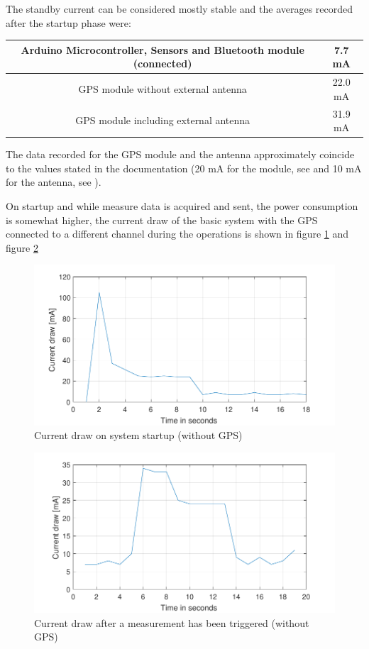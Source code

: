 The standby current can be considered mostly stable and the averages recorded after the startup phase were:
\begin{center}
  \begin{tabular}{ | c | c |}
    \hline
    Arduino Microcontroller, Sensors and Bluetooth module (connected) & 7.7 mA \\ \hline
    GPS module without external antenna & 22.0 mA \\ \hline
    GPS module including external antenna &  31.9 mA \\
    \hline
  \end{tabular}
\end{center}

The data recorded for the GPS module and the antenna approximately coincide to the values stated in the documentation (20 mA for the module, see \cite{AdaUltGPS} and 10 mA for the antenna, see \cite{ExtAnt}).

On startup and while measure data is acquired and sent, the power consumption is somewhat higher, the current draw of the basic system with the GPS connected to a different channel during the operations is shown in figure \ref{fig:startup_current} and figure \ref{fig:send_current} 

\begin{figure}[ht]
\centering
\includegraphics[width=1.0\textwidth]{src/start_current.pdf}
\caption{Current draw on system startup (without GPS)}
\label{fig:startup_current}
\end{figure}

\begin{figure}[ht]
\centering
\includegraphics[width=1.0\textwidth]{src/send_current.pdf}
\caption{Current draw after a measurement has been triggered (without GPS)}
\label{fig:send_current}
\end{figure}

